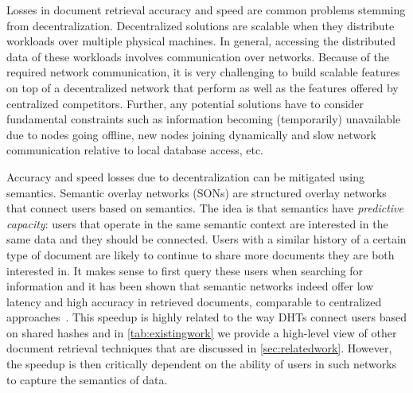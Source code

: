 \documentclass[10pt,journal]{IEEEtran}
\begin{document}
Losses in document retrieval accuracy and speed are common problems stemming from decentralization.
Decentralized solutions are scalable when they distribute workloads over multiple physical machines.
In general, 
accessing the distributed data of these workloads involves communication over networks.
Because of the required network communication, it is very challenging to build scalable features on top of a decentralized network that perform as well as the features offered by centralized competitors.
Further, any potential solutions have to consider fundamental constraints such as information becoming (temporarily) unavailable due to nodes going offline, new nodes joining dynamically and slow network communication relative to local database access, etc. %

Accuracy and speed losses due to decentralization can be mitigated using semantics.
Semantic overlay networks (SONs) are structured overlay networks that connect users based on semantics.
The idea %
is that semantics have \textit{predictive capacity}: users that operate in the same semantic context are interested in the same data and they should be connected.
Users with a similar history of a certain type of document are likely to continue to share more documents they are both interested in.
It makes sense to first query these users when searching for information and it has been shown that semantic networks indeed offer low latency and high accuracy in retrieved documents, comparable to centralized approaches~\cite{tang2003peer}.
This speedup is highly related to the way DHTs connect users based on shared hashes and in \autoref{tab:existingwork} we provide a high-level view of other document retrieval techniques that are discussed in \autoref{sec:relatedwork}.
However, the speedup is then critically dependent on the ability of users in such networks to capture the semantics of data.
\end{document}
